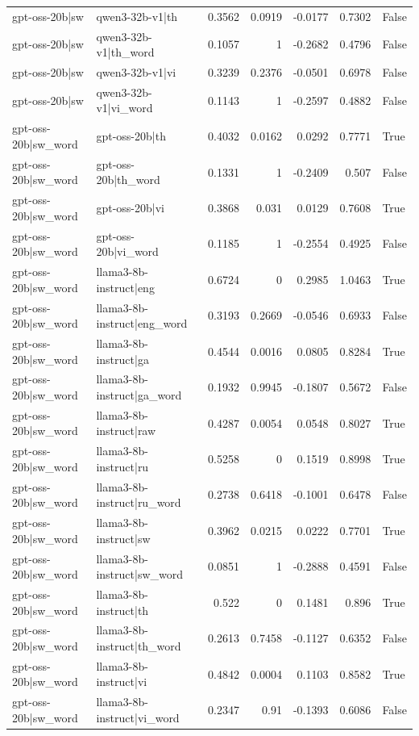 \begin{table}
\begin{tabular}{l l r r r r l}
gpt-oss-20b|sw & qwen3-32b-v1|th & 0.3562 & 0.0919 & -0.0177 & 0.7302 & False \\
gpt-oss-20b|sw & qwen3-32b-v1|th_word & 0.1057 & 1 & -0.2682 & 0.4796 & False \\
gpt-oss-20b|sw & qwen3-32b-v1|vi & 0.3239 & 0.2376 & -0.0501 & 0.6978 & False \\
gpt-oss-20b|sw & qwen3-32b-v1|vi_word & 0.1143 & 1 & -0.2597 & 0.4882 & False \\
gpt-oss-20b|sw_word & gpt-oss-20b|th & 0.4032 & 0.0162 & 0.0292 & 0.7771 & True \\
gpt-oss-20b|sw_word & gpt-oss-20b|th_word & 0.1331 & 1 & -0.2409 & 0.507 & False \\
gpt-oss-20b|sw_word & gpt-oss-20b|vi & 0.3868 & 0.031 & 0.0129 & 0.7608 & True \\
gpt-oss-20b|sw_word & gpt-oss-20b|vi_word & 0.1185 & 1 & -0.2554 & 0.4925 & False \\
gpt-oss-20b|sw_word & llama3-8b-instruct|eng & 0.6724 & 0 & 0.2985 & 1.0463 & True \\
gpt-oss-20b|sw_word & llama3-8b-instruct|eng_word & 0.3193 & 0.2669 & -0.0546 & 0.6933 & False \\
gpt-oss-20b|sw_word & llama3-8b-instruct|ga & 0.4544 & 0.0016 & 0.0805 & 0.8284 & True \\
gpt-oss-20b|sw_word & llama3-8b-instruct|ga_word & 0.1932 & 0.9945 & -0.1807 & 0.5672 & False \\
gpt-oss-20b|sw_word & llama3-8b-instruct|raw & 0.4287 & 0.0054 & 0.0548 & 0.8027 & True \\
gpt-oss-20b|sw_word & llama3-8b-instruct|ru & 0.5258 & 0 & 0.1519 & 0.8998 & True \\
gpt-oss-20b|sw_word & llama3-8b-instruct|ru_word & 0.2738 & 0.6418 & -0.1001 & 0.6478 & False \\
gpt-oss-20b|sw_word & llama3-8b-instruct|sw & 0.3962 & 0.0215 & 0.0222 & 0.7701 & True \\
gpt-oss-20b|sw_word & llama3-8b-instruct|sw_word & 0.0851 & 1 & -0.2888 & 0.4591 & False \\
gpt-oss-20b|sw_word & llama3-8b-instruct|th & 0.522 & 0 & 0.1481 & 0.896 & True \\
gpt-oss-20b|sw_word & llama3-8b-instruct|th_word & 0.2613 & 0.7458 & -0.1127 & 0.6352 & False \\
gpt-oss-20b|sw_word & llama3-8b-instruct|vi & 0.4842 & 0.0004 & 0.1103 & 0.8582 & True \\
gpt-oss-20b|sw_word & llama3-8b-instruct|vi_word & 0.2347 & 0.91 & -0.1393 & 0.6086 & False \\

\end{tabular}
\end{table}
